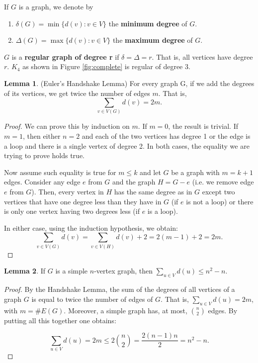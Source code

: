 \documentclass[11pt]{article}
\theoremstyle{definition}
\newtheorem{lemma}{Lemma}
\begin{document}
If $G$ is a graph, we denote by 
    \begin{enumerate}[label=\roman*.]
        \item $\delta(G) = \min \{d(v) : v \in V\}$ the \textbf{minimum degree} of $G$.
        \item $\Delta(G) = \max \{d(v) : v \in V\}$ the  \textbf{maximum degree} of $G$.
    \end{enumerate}

$G$ is a \textbf{regular graph of degree r} if $\delta = \Delta = r$. That is, all vertices have degree $r$. $K_4$ as shown in Figure \ref{fig:complete} is regular of degree 3.

\begin{lemma}(Euler's Handshake Lemma)
For every graph G, if we add the degrees of its vertices, we get twice the number of edges $m$. That is,
    \begin{equation*}
        \sum_{v \in V(G)} d(v) = 2m.
    \end{equation*}
\end{lemma}

\begin{proof}
We can prove this by induction on $m$. If $m=0$, the result is trivial. If $m=1$, then either $n=2$ and each of the two vertices has degree 1 or the edge is a loop and there is a single vertex of degree 2. In both cases, the equality we are trying to prove holds true. 

Now assume such equality is true for $m \leq k$ and let $G$ be a graph with $m=k+1$ edges. Consider any edge $e$ from $G$ and the graph $H = G - e$ (i.e. we remove edge $e$ from $G$). Then, every vertex in $H$ has the same degree as in $G$ except two vertices that have one degree less than they have in $G$ (if $e$ is not a loop) or there is only one vertex having two degrees less (if $e$ is a loop). 

In either case, using the induction hypothesis, we obtain: 
    \begin{equation*}
       \sum_{v \in V(G)} d(v) = \sum_{v \in V(H)} d(v) + 2 = 2(m-1) + 2 = 2m. 
    \end{equation*}
\end{proof}

\begin{lemma} \label{lemma2}
    If $G$ is a simple $n$-vertex graph, then $\sum_{u \in V} d(u) \leq n^2 - n$.
\end{lemma}

\begin{proof}
By the Handshake Lemma, the sum of the degrees of all vertices of a graph $G$ is equal to twice the number of edges of $G$. That is, $\sum_{u \in V} d(u) = 2m$, with $m = \# E(G)$. Moreover, a simple graph has, at most, ${n}\choose{2}$ edges. By putting all this together one obtains:

\begin{equation} 
\sum_{u \in V} d(u) = 2m \leq 2 {n \choose 2} = \frac{2(n-1)n}{2} = n^2 - n.
\end{equation}
\end{proof}
\end{document}
